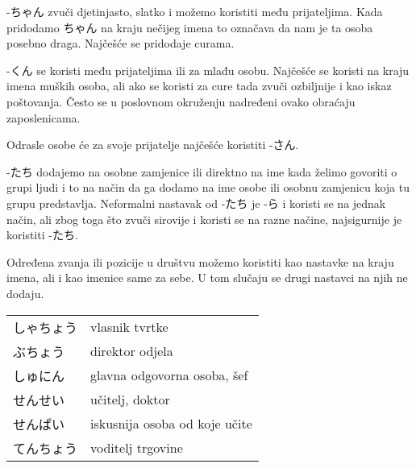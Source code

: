 	-ちゃん zvuči djetinjasto, slatko i možemo koristiti među prijateljima. Kada pridodamo ちゃん na kraju nečijeg imena to označava da nam je ta osoba posebno draga. Najčešće se pridodaje curama.\newline
	
	
	-くん se koristi među prijateljima ili za mlađu osobu. Najčešće se koristi na kraju imena muških osoba, ali ako se koristi za cure tada zvuči ozbiljnije i kao iskaz poštovanja. Često se u poslovnom okruženju nadređeni ovako obraćaju zaposlenicama.\newline
	

Odrasle osobe će za svoje prijatelje najčešće koristiti -さん.\newline

	
	-たち dodajemo na osobne zamjenice ili direktno na ime kada želimo govoriti o grupi ljudi i to na način da ga dodamo na ime osobe ili osobnu zamjenicu koja tu grupu predstavlja. Neformalni nastavak od -たち je -ら i koristi se na jednak način, ali zbog toga što zvuči sirovije i koristi se na razne načine, najsigurnije je koristiti -たち.


	\begin{reibun}
	\end{reibun}

	\ten {}
	
	Određena zvanja ili pozicije u društvu možemo koristiti kao nastavke na kraju imena, ali i kao imenice same za sebe. U tom slučaju se drugi nastavci na njih ne dodaju.
	
	\begin{table}[!h]	
	\begin{tabular}{l l}
		\toprule[2pt]
		しゃちょう&vlasnik tvrtke\\
		ぶちょう&direktor odjela\\
		しゅにん&glavna odgovorna osoba, šef\\
		せんせい&učitelj, doktor\\
		せんぱい&iskusnija osoba od koje učite\\
		てんちょう&voditelj trgovine\\
		\bottomrule[2pt]
	\end{tabular}
	\end{table}
	
